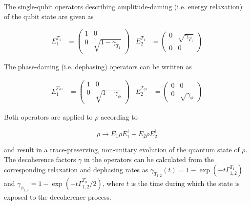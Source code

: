 \smallskip

The single-qubit operators describing amplitude-daming (i.e. energy relaxation) of the qubit state are given as \citep{michael_a._nielsen_quantum_2000}

\begin{align}
 E_1^{T_1} & = \left(\begin{array}{cc} 1 & 0 \\ 0 & \sqrt{1-\gamma_{T_1}} \end{array}\right)   &  E_2^{T_1}  & = \left( \begin{array}{cc} 0 & \sqrt{\gamma_{T_1}} \\ 0 & 0 \end{array} \right) \label{eq:grover_energy_relaxation}
\end{align}

The phase-daming (i.e. dephasing) operators can be written as

\begin{align}
 E_1^{T_{\phi 1}} & = \left(\begin{array}{cc} 1 & 0 \\ 0 & \sqrt{1-\gamma_\phi} \end{array}\right)   &  E_2^{T_{\phi 1}}  & = \left( \begin{array}{cc} 0 & 0 \\ 0 & \sqrt{\gamma_\phi}  \end{array} \right) \label{eq:grover_phase_decoherence}
\end{align}

Both operators are applied to $\rho$ according to

\begin{equation}
\rho \to E_1 \rho E_1^\dagger+E_2 \rho E_2^\dagger
\end{equation}

and result in a trace-preserving, non-unitary evolution of the quantum state of $\rho$. The decoherence factors $\gamma$ in the operators can be calculated from the corresponding relaxation and dephasing rates as $\gamma_{T_{1,2}}(t) = 1-\exp{\left(-t \Gamma_{1,2}^{T_1}\right)}$ and $\gamma_{\phi_{1,2}} = 1-\exp{\left(-t \Gamma_{1,2}^{T_\phi}/2\right)}$, where $t$ is the time during which the state is exposed to the decoherence process.

\smallskip

